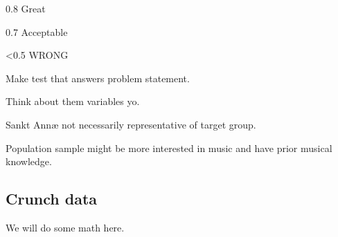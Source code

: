 0.8 Great

0.7 Acceptable

<0.5 WRONG

Make test that answers problem statement.

Think about them variables yo.

Sankt Annæ not necessarily representative of target group.

Population sample might be more interested in music and have prior musical knowledge.

\subsection{Crunch data}
	We will do some math here.\cite{nyBog}